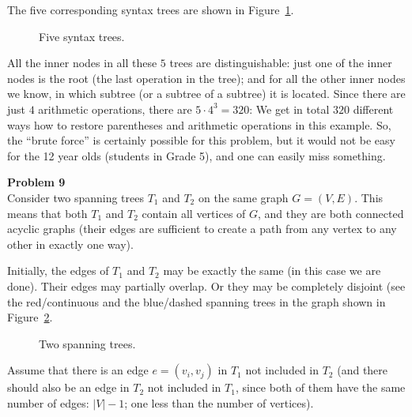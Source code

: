 \documentclass[jou]{apa6}
\begin{document}
The five corresponding syntax trees are shown in Figure~\ref{fig:syntaxtree}. 

\begin{figure}[!htb]
\caption{\label{fig:syntaxtree} Five syntax trees.}
\end{figure}

All the inner nodes in all these $5$ trees are distinguishable: just one of the inner nodes
is the root (the last operation in the tree); and for all the other inner nodes we know, 
in which subtree (or a subtree of a subtree) it is located. 
Since there are just $4$ arithmetic operations, there are $5 \cdot 4^3 = 320$: 
We get in total $320$ different ways how to restore parentheses and arithmetic operations in 
this example. So, the ``brute force'' is certainly possible for this problem, 
but it would not be easy for the 12 year olds (students in Grade 5), 
and one can easily miss something.





\vspace{10pt}
{\bf Problem 9}\\
Consider two spanning trees $T_1$ and $T_2$ on the same graph $G=(V,E)$. 
This means that both $T_1$ and $T_2$ contain all vertices of $G$, and they 
are both connected acyclic graphs (their edges are sufficient to create a path from any vertex
to any other in exactly one way).

Initially, the edges of $T_1$ and $T_2$ may be exactly the same (in this case we are done). 
Their edges may partially overlap. Or they may be completely disjoint (see the red/continuous 
and the blue/dashed spanning trees in the graph shown in Figure~\ref{fig:tree1}. 

\begin{figure}[!htb]
\caption{\label{fig:tree1} Two spanning trees.}
\end{figure}

Assume that there is an edge $e=(v_i,v_j)$ in $T_1$ not included in $T_2$ (and there 
should also be an edge in $T_2$ not included in $T_1$, since both of them have the same
number of edges: $|V|-1$; one less than the number of vertices). 
\end{document}

